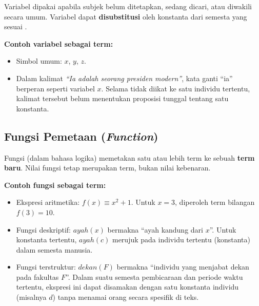 Variabel dipakai apabila subjek belum ditetapkan, sedang dicari, atau diwakili secara umum. Variabel dapat \textbf{disubstitusi} oleh konstanta dari semesta yang sesuai \cite{wiki_first_order_logic}.

\begin{contoh}
\textbf{Contoh variabel sebagai term:}
\begin{itemize}
    \item Simbol umum: $x$, $y$, $z$.
    \item Dalam kalimat \textit{``Ia adalah seorang presiden modern''}, kata ganti ``ia'' berperan seperti variabel $x$. Selama tidak diikat ke satu individu tertentu, kalimat tersebut belum menentukan proposisi tunggal tentang satu konstanta.
\end{itemize}
\end{contoh}

\subsection{Fungsi Pemetaan (\textit{Function})}

Fungsi (dalam bahasa logika) memetakan satu atau lebih term ke sebuah \textbf{term baru}. Nilai fungsi tetap merupakan term, bukan nilai kebenaran.

\begin{contoh}
\textbf{Contoh fungsi sebagai term:}
\begin{itemize}
    \item Ekspresi aritmetika: $f(x) \equiv x^2 + 1$. Untuk $x=3$, diperoleh term bilangan $f(3)=10$.
    \item Fungsi deskriptif: $ayah(x)$ bermakna ``ayah kandung dari $x$''. Untuk konstanta tertentu, $ayah(c)$ merujuk pada individu tertentu (konstanta) dalam semesta manusia.
    \item Fungsi terstruktur: $dekan(F)$ bermakna ``individu yang menjabat dekan pada fakultas $F$''. Dalam suatu semesta pembicaraan dan periode waktu tertentu, ekspresi ini dapat disamakan dengan satu konstanta individu (misalnya $d$) tanpa menamai orang secara spesifik di teks.
\end{itemize}
\end{contoh}
